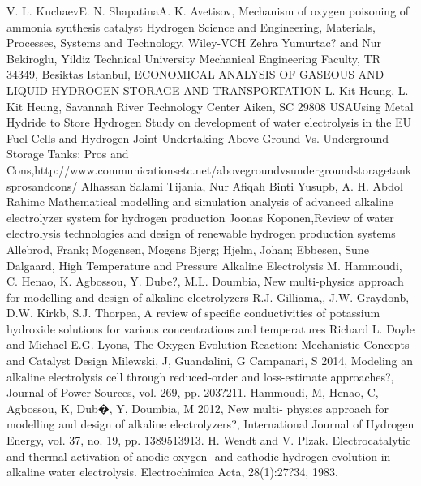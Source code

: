 \singlespacing
\begin{thebibliography}{9}
\linespread{1} 
V. L. KuchaevE. N. ShapatinaA. K. Avetisov, Mechanism of oxygen poisoning of ammonia synthesis catalyst
Hydrogen Science and Engineering, Materials, Processes, Systems and Technology, Wiley-VCH
Zehra Yumurtac? and Nur Bekiroglu, Yildiz Technical University Mechanical Engineering Faculty, TR 34349, Besiktas Istanbul, ECONOMICAL ANALYSIS OF GASEOUS AND LIQUID HYDROGEN STORAGE AND TRANSPORTATION
L. Kit Heung, L. Kit Heung, Savannah River Technology Center Aiken, SC 29808 USAUsing Metal Hydride to Store Hydrogen
Study on development of water electrolysis in the EU Fuel Cells and Hydrogen Joint Undertaking
Above Ground Vs. Underground Storage Tanks: Pros and Cons,http://www.communicationsetc.net/above\-ground\-vs\-underground\-storage\-tanks\-pros\-and\-cons/
Alhassan Salami Tijania, Nur Afiqah Binti Yusupb, A. H. Abdol Rahimc
Mathematical modelling and simulation analysis of advanced alkaline electrolyzer system for hydrogen production
Joonas Koponen,Review of water electrolysis technologies and design of renewable hydrogen production systems
Allebrod, Frank; Mogensen, Mogens Bjerg; Hjelm, Johan; Ebbesen, Sune Dalgaard, High Temperature and Pressure Alkaline Electrolysis
M. Hammoudi, C. Henao, K. Agbossou, Y. Dube?, M.L. Doumbia, New multi-physics approach for modelling and design of alkaline electrolyzers
R.J. Gilliama,, J.W. Graydonb, D.W. Kirkb, S.J. Thorpea, A review of specific conductivities of potassium hydroxide solutions for various concentrations and temperatures
Richard L. Doyle and Michael E.G. Lyons, The Oxygen Evolution Reaction: Mechanistic Concepts and Catalyst Design
Milewski, J, Guandalini, G  Campanari, S 2014, Modeling an alkaline electrolysis cell through reduced-order and loss-estimate approaches?, Journal of Power Sources, vol. 269, pp. 203?211.
Hammoudi, M, Henao, C, Agbossou, K, Dub�, Y, Doumbia, M 2012, New multi- physics approach for modelling and design of alkaline electrolyzers?, International Journal of Hydrogen Energy, vol. 37, no. 19, pp. 1389513913.
H. Wendt and V. Plzak. Electrocatalytic and thermal activation of anodic oxygen- and cathodic hydrogen-evolution in alkaline water electrolysis. Electrochimica Acta, 28(1):27?34, 1983.

\end{thebibliography}
